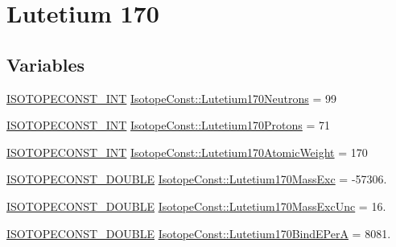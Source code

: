 \hypertarget{group___isotope_const-_lutetium-_lu170}{}\section{Lutetium 170}
\label{group___isotope_const-_lutetium-_lu170}
\subsection*{Variables}
\begin{DoxyCompactItemize}
\item 
\mbox{\hyperlink{group___isotope_const-_macros_ga5f18360b3e99483a35c32d789e62621c}{I\+S\+O\+T\+O\+P\+E\+C\+O\+N\+S\+T\+\_\+\+I\+NT}} \mbox{\hyperlink{group___isotope_const-_lutetium-_lu170_ga7bf4a36ed60ee85527351a21f7f646e4}{Isotope\+Const\+::\+Lutetium170\+Neutrons}} = 99
\item 
\mbox{\hyperlink{group___isotope_const-_macros_ga5f18360b3e99483a35c32d789e62621c}{I\+S\+O\+T\+O\+P\+E\+C\+O\+N\+S\+T\+\_\+\+I\+NT}} \mbox{\hyperlink{group___isotope_const-_lutetium-_lu170_gaf95f149ebbbfe453b7f373bac52e035a}{Isotope\+Const\+::\+Lutetium170\+Protons}} = 71
\item 
\mbox{\hyperlink{group___isotope_const-_macros_ga5f18360b3e99483a35c32d789e62621c}{I\+S\+O\+T\+O\+P\+E\+C\+O\+N\+S\+T\+\_\+\+I\+NT}} \mbox{\hyperlink{group___isotope_const-_lutetium-_lu170_ga1789f8434c4cfc4d23647e234592f45b}{Isotope\+Const\+::\+Lutetium170\+Atomic\+Weight}} = 170
\item 
\mbox{\hyperlink{group___isotope_const-_macros_ga8f45a7272ce02c0b4c65c44636ed719a}{I\+S\+O\+T\+O\+P\+E\+C\+O\+N\+S\+T\+\_\+\+D\+O\+U\+B\+LE}} \mbox{\hyperlink{group___isotope_const-_lutetium-_lu170_ga63809c7ec8308877b7159002ef6373f3}{Isotope\+Const\+::\+Lutetium170\+Mass\+Exc}} = -\/57306.
\item 
\mbox{\hyperlink{group___isotope_const-_macros_ga8f45a7272ce02c0b4c65c44636ed719a}{I\+S\+O\+T\+O\+P\+E\+C\+O\+N\+S\+T\+\_\+\+D\+O\+U\+B\+LE}} \mbox{\hyperlink{group___isotope_const-_lutetium-_lu170_ga127bdc4be7e97a4326016bc0b29a520d}{Isotope\+Const\+::\+Lutetium170\+Mass\+Exc\+Unc}} = 16.
\item 
\mbox{\hyperlink{group___isotope_const-_macros_ga8f45a7272ce02c0b4c65c44636ed719a}{I\+S\+O\+T\+O\+P\+E\+C\+O\+N\+S\+T\+\_\+\+D\+O\+U\+B\+LE}} \mbox{\hyperlink{group___isotope_const-_lutetium-_lu170_ga73ea1158a61a6e3ead6da6bd27b2f0a6}{Isotope\+Const\+::\+Lutetium170\+Bind\+E\+PerA}} = 8081.
\item 

\end{DoxyCompactItemize}
